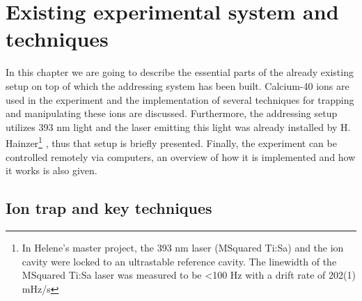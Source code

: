 
\chapter{Existing experimental system and techniques}
In this chapter we are going to describe the essential parts of the already existing setup on top of which the addressing system has been built. Calcium-40 ions are used in the experiment and the implementation of several techniques for trapping and manipulating these ions are discussed. Furthermore, the addressing setup utilizes 393 nm light and the laser emitting this light was already installed by H. Hainzer\footnote{In Helene's master project, the 393 nm laser (MSquared Ti:Sa) and the ion cavity were locked to an ultrastable reference cavity. The linewidth of the MSquared Ti:Sa laser was measured to be <100 Hz with a drift rate of 202(1) mHz/s} \cite{helene}, thus that setup is briefly presented. Finally, the experiment can be controlled remotely via computers, an overview of how it is implemented and how it works is also given.

\section{Ion trap and key techniques}
